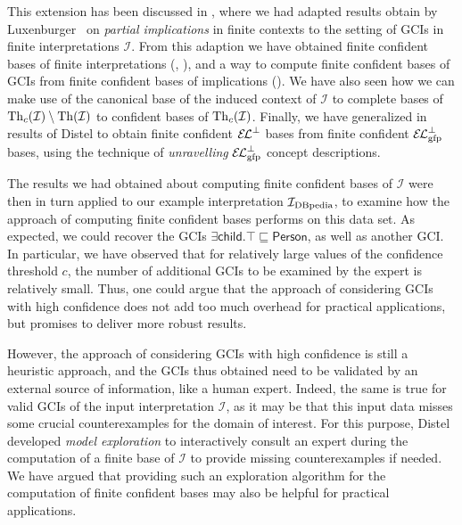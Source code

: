 This extension has been discussed in , where we had adapted
results obtain by Luxenburger~\cite{diss:Luxenburger} on \emph{partial implications} in
finite contexts to the setting of GCIs in finite interpretations $\mathcal{I}$.  From this
adaption we have obtained finite confident bases of finite interpretations
(, ), and a way to compute finite
confident bases of GCIs from finite confident bases of implications
().  We have also
seen how we can make use of the canonical base of the induced context of $\mathcal{I}$ to
complete bases of $\operatorname{Th}_{c}(\mathcal{I}) \setminus \operatorname{Th}(\mathcal{I})$ to confident bases of
$\operatorname{Th}_{c}(\mathcal{I})$.  Finally, we have generalized in 
results of Distel to obtain finite confident ${{\mathcal{E}\kern-.3ex\mathcal{L}}^\bot}$ bases from finite confident
${{\mathcal{E}\kern-.3ex\mathcal{L}}_\text{gfp}^\bot}$ bases, using the technique of \emph{unravelling} ${{\mathcal{E}\kern-.3ex\mathcal{L}}_\text{gfp}^\bot}$ concept
descriptions.

The results we had obtained about computing finite confident bases of $\mathcal{I}$ were
then in turn applied to our example interpretation ${\mathcal{I}_{\text{DBpedia}}}$, to examine how the
approach of computing finite confident bases performs on this data set.  As expected, we
could recover the GCIs $\exists \mathsf{child}. \top \sqsubseteq \mathsf{Person}$, as well
as another GCI.  In particular, we have observed that for relatively large values of the
confidence threshold $c$, the number of additional GCIs to be examined by the expert is
relatively small.  Thus, one could argue that the approach of considering GCIs with high
confidence does not add too much overhead for practical applications, but promises to
deliver more robust results.

However, the approach of considering GCIs with high confidence is still a heuristic
approach, and the GCIs thus obtained need to be validated by an external source of
information, like a human expert.  Indeed, the same is true for valid GCIs of the input
interpretation $\mathcal{I}$, as it may be that this input data misses some crucial
counterexamples for the domain of interest.  For this purpose, Distel developed
\emph{model exploration} to interactively consult an expert during the computation of a
finite base of $\mathcal{I}$ to provide missing counterexamples if needed.  We have argued
that providing such an exploration algorithm for the computation of finite confident bases
may also be helpful for practical applications.

